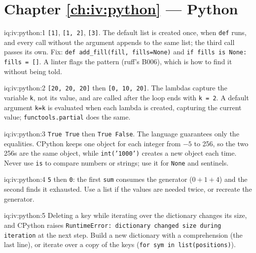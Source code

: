 \section*{Chapter \ref{ch:iv:python} --- Python}

\begin{solution}{iq:iv:python:1}
\texttt{[1]}, \texttt{[1, 2]}, \texttt{[3]}. The default list is created once, when \texttt{def} runs, and every call without the argument
appends to the same list; the third call passes its own. Fix: \texttt{def add\_fill(fill, fills=None)} and \texttt{if fills is None:
fills = []}. A linter flags the pattern (ruff's B006), which is how to find it without being told.
\end{solution}

\begin{solution}{iq:iv:python:2}
\texttt{[20, 20, 20]} then \texttt{[0, 10, 20]}. The lambdas capture the variable \texttt{k}, not its value, and are called after the loop
ends with \texttt{k = 2}. A default argument \texttt{k=k} is evaluated when each lambda is created, capturing the current value;
\texttt{functools.partial} does the same.
\end{solution}

\begin{solution}{iq:iv:python:3}
\texttt{True True} then \texttt{True False}. The language guarantees only the equalities. CPython keeps one object for each integer from
$-5$ to 256, so the two 256s are the same object, while \texttt{int('1000')} creates a new object each time. Never use \texttt{is} to
compare numbers or strings; use it for \texttt{None} and sentinels.
\end{solution}

\begin{solution}{iq:iv:python:4}
\texttt{5} then \texttt{0}: the first \texttt{sum} consumes the generator ($0 + 1 + 4$) and the second finds it exhausted. Use a list if the
values are needed twice, or recreate the generator.
\end{solution}

\begin{solution}{iq:iv:python:5}
Deleting a key while iterating over the dictionary changes its size, and CPython raises \texttt{RuntimeError: dictionary changed size
during iteration} at the next step. Build a new dictionary with a comprehension (the last line), or iterate over a copy of the keys
(\texttt{for sym in list(positions)}).
\end{solution}

